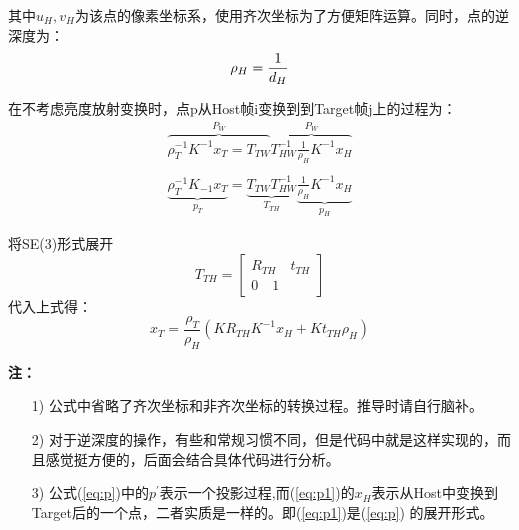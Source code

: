 其中$u_{H},v_{H}$为该点的像素坐标系，使用齐次坐标为了方便矩阵运算。同时，点的逆深度为：
\begin{equation}
\rho_{H}=\frac{1}{d_{H}}\\
\end{equation}

在不考虑亮度放射变换时，点p从Host帧i变换到到Target帧j上的过程为：
\begin{equation}
\begin{matrix}
    \overbrace{\rho_{T}^{-1} K^{-1} x_{T} =  T_{TW}}^{P_W}   \overbrace{T_{HW}^{-1} \frac{1}{\rho_{H}}K^{-1}x_{H}}^{P_W} \\ \\
	\underbrace{\rho_{T}^{-1} K_{-1} x_{T}}_{p_T} =  \underbrace{T_{TW}T_{HW}^{-1}}_{T_{TH}}  \underbrace{\frac{1}{\rho_{H}}K^{-1}x_{H}}_{p_H}
\end{matrix}
\end{equation}

将SE(3)形式展开
\begin{equation}
	T_{TH}=
	\left[ \begin{array}{cc}
	R_{TH} \quad t_{TH}\\
	0      \quad  1
	\end{array}
	\right]
\end{equation}
代入上式得：\\
\begin{equation}\label{eq:p1}
	x_{T} = \frac{\rho_{T}}{\rho_{H}}(KR_{TH}K^{-1}x_{H}+Kt_{TH}\rho_{H})
\end{equation}

\noindent \textbf{注：}
\begin{itemize}
  \item [1)] 公式中省略了齐次坐标和非齐次坐标的转换过程。推导时请自行脑补。
  \item [2)] 对于逆深度的操作，有些和常规习惯不同，但是代码中就是这样实现的，而且感觉挺方便的，后面会结合具体代码进行分析。
  \item [3)] 公式(\ref{eq:p})中的$p^{'}$表示一个投影过程,而(\ref{eq:p1})的$x_{H}$表示从Host中变换到Target后的一个点，二者实质是一样的。即(\ref{eq:p1})是(\ref{eq:p})
  的展开形式。
\end{itemize} 



